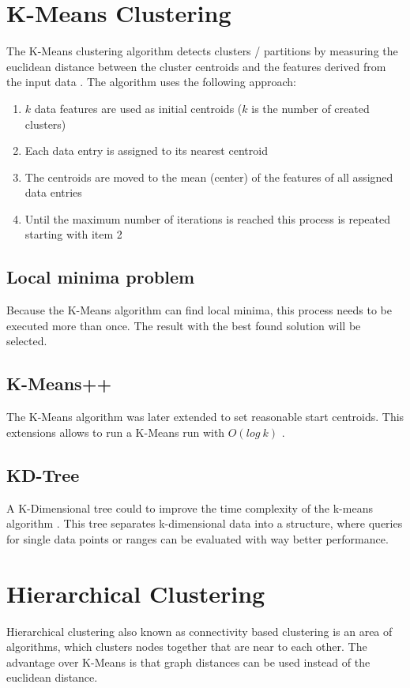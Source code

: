 \section{K-Means Clustering}
\label{sec:K-Means}
The K-Means clustering algorithm detects clusters / partitions by measuring the euclidean distance between the cluster centroids and the features derived from the input data \cite{k-means++:2007}. The algorithm uses the following approach:

\begin{enumerate}
    \item $k$ data features are used as initial centroids ($k$ is the number of created clusters)
    \item Each data entry is assigned to its nearest centroid
    \item The centroids are moved to the mean (center) of the features of all assigned data entries
    \item Until the maximum number of iterations is reached this process is repeated starting with item 2
\end{enumerate}

\subsection{Local minima problem}
Because the K-Means algorithm can find local minima, this process needs to be executed more than once. The result with the best found solution will be selected.

\subsection{K-Means++} \label{sec:k-means++}
The K-Means algorithm was later extended to set reasonable start centroids. This extensions allows to run a K-Means run with $O(log\ k)$ \cite{k-means++:2007}.

\subsection{KD-Tree} \label{sec:k-means_KD-tree}
A K-Dimensional tree could to improve the time complexity of the k-means algorithm \citep{kmeans:2002}. This tree separates k-dimensional data into a structure, where queries for single data points or ranges can be evaluated with way better performance.

\pagebreak
\FloatBarrier
\section{Hierarchical Clustering} 
\label{sec:hierarchicalClustering}
Hierarchical clustering also known as connectivity based clustering is an area of algorithms, which clusters nodes together that are near to each other. The advantage over K-Means is that graph distances can be used instead of the euclidean distance.

